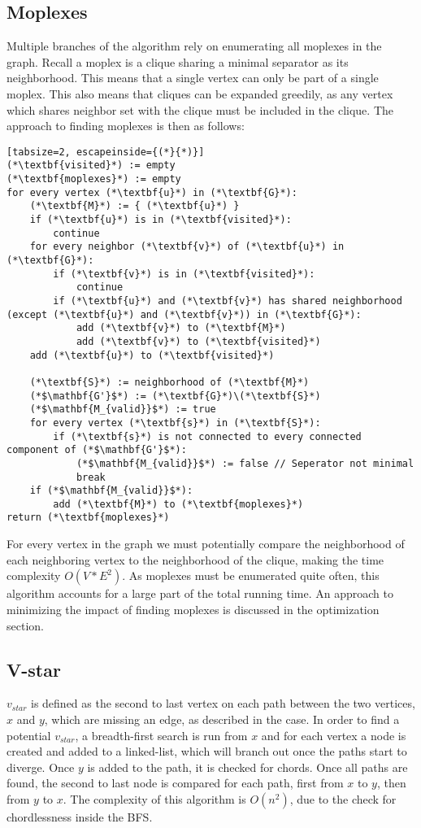 \documentclass{article}
\begin{document}
		\subsection{Moplexes}
		Multiple branches of the algorithm rely on enumerating all moplexes in the graph.
		Recall a moplex is a clique sharing a minimal separator as its neighborhood.
		This means that a single vertex can only be part of a single moplex.
		This also means that cliques can be expanded greedily, as any vertex which shares neighbor set with the clique must be included in the clique.
		The approach to finding moplexes is then as follows:
		\begin{lstlisting}[tabsize=2, escapeinside={(*}{*)}]
(*\textbf{visited}*) := empty
(*\textbf{moplexes}*) := empty
for every vertex (*\textbf{u}*) in (*\textbf{G}*):
	(*\textbf{M}*) := { (*\textbf{u}*) }
	if (*\textbf{u}*) is in (*\textbf{visited}*):
		continue
	for every neighbor (*\textbf{v}*) of (*\textbf{u}*) in (*\textbf{G}*):
		if (*\textbf{v}*) is in (*\textbf{visited}*):
			continue
		if (*\textbf{u}*) and (*\textbf{v}*) has shared neighborhood (except (*\textbf{u}*) and (*\textbf{v}*)) in (*\textbf{G}*):
			add (*\textbf{v}*) to (*\textbf{M}*)
			add (*\textbf{v}*) to (*\textbf{visited}*)
	add (*\textbf{u}*) to (*\textbf{visited}*)

	(*\textbf{S}*) := neighborhood of (*\textbf{M}*)
	(*$\mathbf{G'}$*) := (*\textbf{G}*)\(*\textbf{S}*)
	(*$\mathbf{M_{valid}}$*) := true
	for every vertex (*\textbf{s}*) in (*\textbf{S}*):
		if (*\textbf{s}*) is not connected to every connected component of (*$\mathbf{G'}$*):
			(*$\mathbf{M_{valid}}$*) := false // Seperator not minimal
			break
	if (*$\mathbf{M_{valid}}$*):
		add (*\textbf{M}*) to (*\textbf{moplexes}*)
return (*\textbf{moplexes}*)
		\end{lstlisting}
		For every vertex in the graph we must potentially compare the neighborhood of each neighboring vertex to the neighborhood of the clique, making the time complexity $O(V*E^2)$.
		As moplexes must be enumerated quite often, this algorithm accounts for a large part of the total running time.
		An approach to minimizing the impact of finding moplexes is discussed in the optimization section.

		\subsection{V-star}
		$v_{star}$ is defined as the second to last vertex on each path between the two vertices, $x$ and $y$, which are missing an edge, as described in the case.
		In order to find a potential $v_{star}$, a breadth-first search is run from $x$ and for each vertex a node is created and added to a linked-list, which will branch out once the paths start to diverge.
		Once $y$ is added to the path, it is checked for chords.
		Once all paths are found, the second to last node is compared for each path, first from $x$ to $y$, then from $y$ to $x$.
		The complexity of this algorithm is $O(n^2)$, due to the check for chordlessness inside the BFS.
\end{document}
